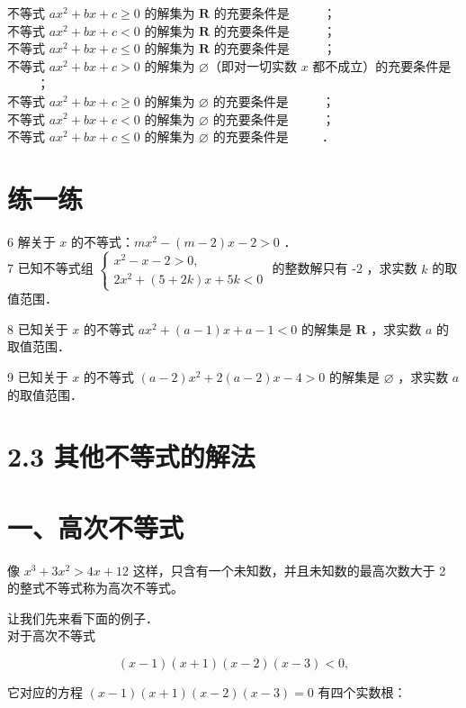 \documentclass[10pt]{article}
\begin{document}
不等式 \(a x^{2}+b x+c \geqslant 0\) 的解集为 \(\mathbf{R}\) 的充要条件是 \(\qquad\) ；\\
不等式 \(a x^{2}+b x+c<0\) 的解集为 \(\mathbf{R}\) 的充要条件是 \(\qquad\) ；\\
不等式 \(a x^{2}+b x+c \leqslant 0\) 的解集为 \(\mathbf{R}\) 的充要条件是 \(\qquad\) ；\\
不等式 \(a x^{2}+b x+c>0\) 的解集为 \(\varnothing\)（即对一切实数 \(x\) 都不成立）的充要条件是\\
\(\qquad\) ；\\
不等式 \(a x^{2}+b x+c \geqslant 0\) 的解集为 \(\varnothing\) 的充要条件是 \(\qquad\) ；\\
不等式 \(a x^{2}+b x+c<0\) 的解集为 \(\varnothing\) 的充要条件是 \(\qquad\) ；\\
不等式 \(a x^{2}+b x+c \leqslant 0\) 的解集为 \(\varnothing\) 的充要条件是 \(\qquad\) ．

\section*{练一练}
6 解关于 \(x\) 的不等式：\(m x^{2}-(m-2) x-2>0\) ．\\
7 已知不等式组 \(\left\{\begin{array}{l}x^{2}-x-2>0, \\ 2 x^{2}+(5+2 k) x+5 k<0\end{array}\right.\) 的整数解只有 -2 ，求实数 \(k\) 的取值范围．

8 已知关于 \(x\) 的不等式 \(a x^{2}+(a-1) x+a-1<0\) 的解集是 \(\mathbf{R}\) ，求实数 \(a\) 的取值范围．

9 已知关于 \(x\) 的不等式 \((a-2) x^{2}+2(a-2) x-4>0\) 的解集是 \(\varnothing\) ，求实数 \(a\) 的取值范围．

\section*{2.3 其他不等式的解法}
\section*{一、高次不等式}
像 \(x^{3}+3 x^{2}>4 x+12\) 这样，只含有一个未知数，并且未知数的最高次数大于 2 的整式不等式称为高次不等式。

让我们先来看下面的例子．\\
对于高次不等式

\[
(x-1)(x+1)(x-2)(x-3)<0,
\]

它对应的方程 \((x-1)(x+1)(x-2)(x-3)=0\) 有四个实数根：
\end{document}
